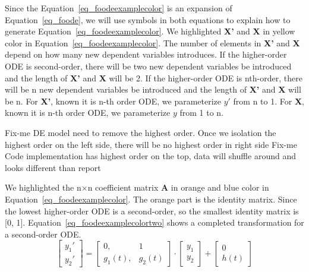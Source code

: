Since the Equation~\ref{eq_foodeexamplecolor} is an expansion of Equation~\ref{eq_foode}, we will use symbols in both equations to explain how to generate Equation~\ref{eq_foodeexamplecolor}. We highlighted \textbf{X'} and \textbf{X} in yellow color in Equation~\ref{eq_foodeexamplecolor}. The number of elements in \textbf{X'} and \textbf{X} depend on how many new dependent variables introduces. If the higher-order ODE is second-order, there will be two new dependent variables be introduced and the length of \textbf{X'} and \textbf{X} will be 2. If the higher-order ODE is nth-order, there will be n new dependent variables be introduced and the length of \textbf{X'} and \textbf{X} will be n. For \textbf{X'}, known it is n-th order ODE, we parameterize $y'$ from n to 1. For \textbf{X}, known it is n-th order ODE, we parameterize $y$ from 1 to n.



Fix-me DE model need to remove the highest order. Once we isolation the highest order on the left side, there will be no highest order in right side
Fix-me Code implementation has highest order on the top, data will shuffle around and looks different than report


We highlighted the n$\times$n coefficient matrix \textbf{A} in orange and blue color in Equation~\ref{eq_foodeexamplecolor}. The orange part is the identity matrix. Since the lowest higher-order ODE is a second-order, so the smallest identity matrix is [0, 1]. Equation~\ref{eq_foodeexamplecolortwo} shows a completed transformation for a second-order ODE.
\begin{equation} \label{eq_foodeexamplecolortwo}
	\begin{bmatrix}
		{y_{1}'} \\
    {y_{2}'} 
	\end{bmatrix}
    = 
  \begin{bmatrix}
		{0}, & {1} \\
    {g_{1}(t)}, & {g_{2}(t)}
	\end{bmatrix}
    \cdot
  \begin{bmatrix}
		{y_{1}} \\
    {y_{2}} 
	\end{bmatrix}
    + 
  \begin{bmatrix}
    {0} \\
    {h(t)}
	\end{bmatrix}
\end{equation}

